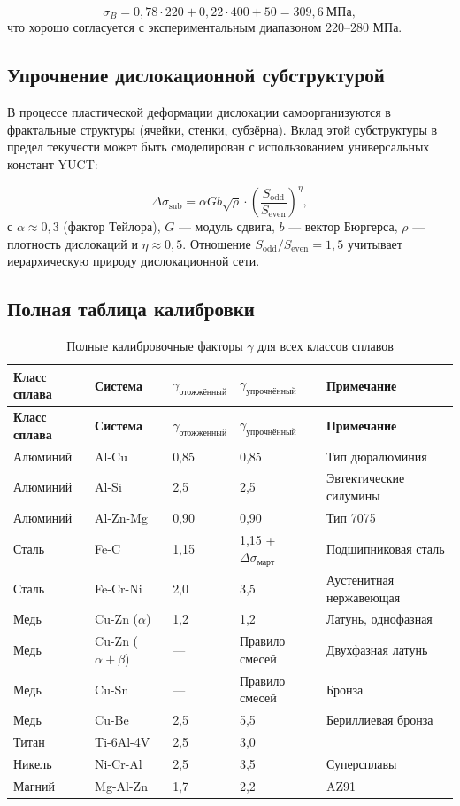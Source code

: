 \documentclass[12pt,a4paper]{article}
\begin{document}
	\[
	\sigma_B = 0,78 \cdot 220 + 0,22 \cdot 400 + 50 = 309,6\ \text{МПа},
	\]
	что хорошо согласуется с экспериментальным диапазоном 220–280 МПа.
	
	\subsection{Упрочнение дислокационной субструктурой}
	\label{subsec:dislocation-substructure}
	
	В процессе пластической деформации дислокации самоорганизуются в фрактальные структуры (ячейки, стенки, субзёрна). Вклад этой субструктуры в предел текучести может быть смоделирован с использованием универсальных констант YUCT:
	
	\[
	\Delta\sigma_{\text{sub}} = \alpha G b \sqrt{\rho} \cdot \left( \frac{S_{\text{odd}}}{S_{\text{even}}} \right)^{\eta},
	\]
	с \(\alpha \approx 0,3\) (фактор Тейлора), \(G\) — модуль сдвига, \(b\) — вектор Бюргерса, \(\rho\) — плотность дислокаций и \(\eta \approx 0,5\). Отношение \(S_{\text{odd}}/S_{\text{even}}=1,5\) учитывает иерархическую природу дислокационной сети.
	
	\subsection{Полная таблица калибровки}
	\label{subsec:complete-calibration}
	
	\begin{longtable}{p{3cm}p{2.5cm}p{2.5cm}p{2.5cm}p{4cm}}
		\caption{Полные калибровочные факторы \(\gamma\) для всех классов сплавов} \label{tab:complete-gamma} \\
		\toprule
		\textbf{Класс сплава} & \textbf{Система} & \(\gamma_{\text{отожжённый}}\) & \(\gamma_{\text{упрочнённый}}\) & \textbf{Примечание} \\
		\midrule
		\endfirsthead
		\toprule
		\textbf{Класс сплава} & \textbf{Система} & \(\gamma_{\text{отожжённый}}\) & \(\gamma_{\text{упрочнённый}}\) & \textbf{Примечание} \\
		\midrule
		\endhead
		Алюминий & Al-Cu & 0,85 & 0,85 & Тип дюралюминия \\
		Алюминий & Al-Si & 2,5 & 2,5 & Эвтектические силумины \\
		Алюминий & Al-Zn-Mg & 0,90 & 0,90 & Тип 7075 \\
		Сталь & Fe-C & 1,15 & 1,15 + \(\Delta\sigma_{\text{март}}\) & Подшипниковая сталь \\
		Сталь & Fe-Cr-Ni & 2,0 & 3,5 & Аустенитная нержавеющая \\
		Медь & Cu-Zn (\(\alpha\)) & 1,2 & 1,2 & Латунь, однофазная \\
		Медь & Cu-Zn (\(\alpha+\beta\)) & — & Правило смесей & Двухфазная латунь \\
		Медь & Cu-Sn & — & Правило смесей & Бронза \\
		Медь & Cu-Be & 2,5 & 5,5 & Бериллиевая бронза \\
		Титан & Ti-6Al-4V & 2,5 & 3,0 & \\
		Никель & Ni-Cr-Al & 2,5 & 3,5 & Суперсплавы \\
		Магний & Mg-Al-Zn & 1,7 & 2,2 & AZ91 \\
		\bottomrule
	\end{longtable}
	
\end{document}
